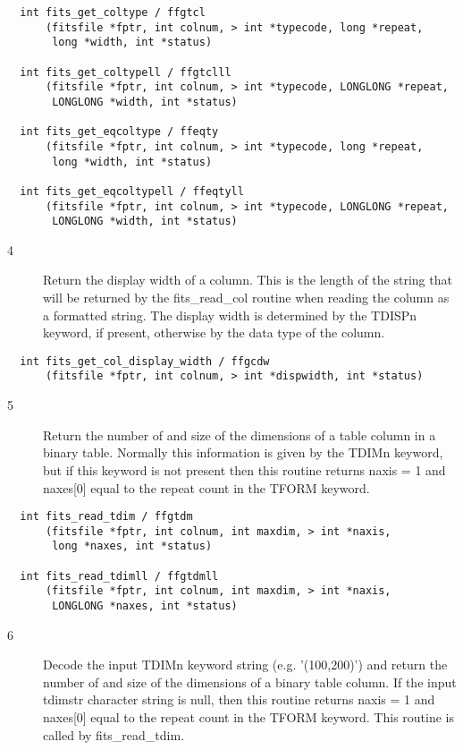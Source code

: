 \documentclass[11pt]{book}
\begin{document}
\begin{verbatim}
  int fits_get_coltype / ffgtcl
      (fitsfile *fptr, int colnum, > int *typecode, long *repeat,
       long *width, int *status)

  int fits_get_coltypell / ffgtclll
      (fitsfile *fptr, int colnum, > int *typecode, LONGLONG *repeat,
       LONGLONG *width, int *status)

  int fits_get_eqcoltype / ffeqty
      (fitsfile *fptr, int colnum, > int *typecode, long *repeat,
       long *width, int *status)

  int fits_get_eqcoltypell / ffeqtyll
      (fitsfile *fptr, int colnum, > int *typecode, LONGLONG *repeat,
       LONGLONG *width, int *status)
\end{verbatim}

\begin{description}
\item[4 ] Return the display width of a column.  This is the length
    of the string that will be returned by the fits\_read\_col routine
    when reading the column as a formatted string.  The display width is
    determined by the TDISPn keyword, if present, otherwise by the data
   type of the column. \label{ffgcdw}
\end{description}

\begin{verbatim}
  int fits_get_col_display_width / ffgcdw
      (fitsfile *fptr, int colnum, > int *dispwidth, int *status)
\end{verbatim}


\begin{description}
\item[5 ] Return the number of and size of the dimensions of a table column in
    a binary table. Normally this information is given by the TDIMn keyword,
    but if this keyword is not present then this routine returns naxis = 1
   and naxes[0] equal to the repeat count in the TFORM keyword. \label{ffgtdm}
\end{description}

\begin{verbatim}
  int fits_read_tdim / ffgtdm
      (fitsfile *fptr, int colnum, int maxdim, > int *naxis,
       long *naxes, int *status)

  int fits_read_tdimll / ffgtdmll
      (fitsfile *fptr, int colnum, int maxdim, > int *naxis,
       LONGLONG *naxes, int *status)
\end{verbatim}

\begin{description}
\item[6 ] Decode the input TDIMn keyword string (e.g. '(100,200)') and return the
    number of and size of the dimensions of a binary table column. If the input
    tdimstr character string is null, then this routine returns naxis = 1
    and naxes[0] equal to the repeat count in the TFORM keyword. This routine
   is called by fits\_read\_tdim.  \label{ffdtdm}
\end{description}
\end{document}
